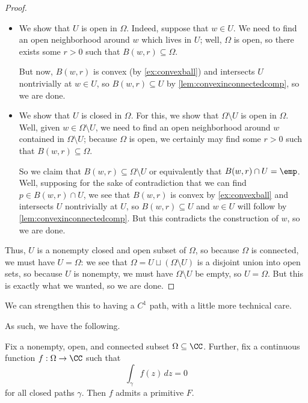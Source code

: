 \begin{proof}
\begin{itemize}
		\item We show that $U$ is open in $\Omega$. Indeed, suppose that $w\in U$. We need to find an open neighborhood around $w$ which lives in $U$; well, $\Omega$ is open, so there exists some $r>0$ such that $B(w,r)\subseteq\Omega$.
		
		But now, $B(w,r)$ is convex (by \autoref{ex:convexball}) and intersects $U$ nontrivially at $w\in U$, so $B(w,r)\subseteq U$ by \autoref{lem:convexinconnectedcomp}, so we are done.

		\item We show that $U$ is closed in $\Omega$. For this, we show that $\Omega\setminus U$ is open in $\Omega$. Well, given $w\in\Omega\setminus U$, we need to find an open neighborhood around $w$ contained in $\Omega\setminus U$; because $\Omega$ is open, we certainly may find some $r>0$ such that $B(w,r)\subseteq\Omega$.

		So we claim that $B(w,r)\subseteq\Omega\setminus U$ or equivalently that $B(w,r)\cap U=\emp$. Well, supposing for the sake of contradiction that we can find $p\in B(w,r)\cap U$, we see that $B(w,r)$ is convex by \autoref{ex:convexball} and intersects $U$ nontrivially at $U$, so $B(w,r)\subseteq U$ and $w\in U$ will follow by \autoref{lem:convexinconnectedcomp}. But this contradicts the construction of $w$, so we are done.
	\end{itemize}
	Thus, $U$ is a nonempty closed and open subset of $\Omega$, so because $\Omega$ is connected, we must have $U=\Omega$: we see that $\Omega=U\sqcup(\Omega\setminus U)$ is a disjoint union into open sets, so because $U$ is nonempty, we must have $\Omega\setminus U$ be empty, so $U=\Omega$. But this is exactly what we wanted, so we are done.
\end{proof}
\begin{remark}
	We can strengthen this to having a $C^1$ path, with a little more technical care.
\end{remark}
As such, we have the following.
\begin{theorem}
	Fix a nonempty, open, and connected subset $\Omega\subseteq\CC$. Further, fix a continuous function $f:\Omega\to\CC$ such that
	\[\int_\gamma f(z)\,dz=0\]
	for all closed paths $\gamma$. Then $f$ admits a primitive $F$.
\end{theorem}

